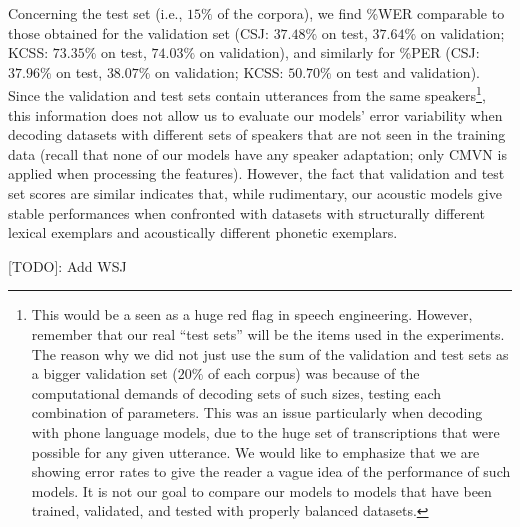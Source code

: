Concerning the test set (i.e., $15\%$ of the corpora), we find \%WER comparable to those obtained for the validation set (CSJ: $37.48\%$ on test, $37.64\%$ on validation; KCSS: $73.35\%$ on test, $74.03\%$ on validation), and similarly for \%PER (CSJ: $37.96\%$ on test, $38.07\%$ on validation; KCSS: $50.70\%$ on test and validation).
Since the validation and test sets contain utterances from the same speakers\footnote{This would be a seen as a huge red flag in speech engineering. However, remember that our real ``test sets'' will be the items used in the experiments. The reason why we did not just use the sum of the validation and test sets as a bigger validation set ($20\%$ of each corpus) was because of the computational demands of decoding sets of such sizes, testing each combination of parameters. This was an issue particularly when decoding with phone language models, due to the huge set of transcriptions that were possible for any given utterance. We would like to emphasize that we are showing error rates to give the reader a vague idea of the performance of such models. It is not our goal to compare our models to models that have been trained, validated, and tested with properly balanced datasets.}, this information does not allow us to evaluate our models' error variability when decoding datasets with different sets of speakers that are not seen in the training data (recall that none of our models have any speaker adaptation; only CMVN is applied when processing the features). However, the fact that validation and test set scores are similar indicates that, while rudimentary, our acoustic models give stable performances when confronted with datasets with structurally different lexical exemplars and acoustically different phonetic exemplars.   

{\color{red}[TODO]: Add WSJ}

